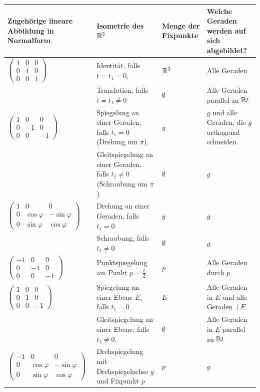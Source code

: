 \documentclass[
 a4paper,
 12pt,
 parskip=half
 ]{scrartcl}
\theoremstyle{plain}
\theoremstyle{definition}
\begin{document}
 {\center \small
 \begin{tabularx}{.95\textwidth}{|>{\center}m{3.6cm}|>{\center}m{3cm}|>{\center}m{3cm}|X|}
  \hline
  Zugehörige lineare Abbildung in Normalform 
   & Isometrie des $\mathbb{R}^3$ 
   & Menge der Fixpunkte 
   & Welche Geraden werden auf sich abgebildet? \\
  \hline
  $\begin{pmatrix} 1 & 0 & 0 \\ 0 & 1 & 0 \\ 0 & 0 & 1 \end{pmatrix}$ 
   & Identität, falls $t = t_1 = 0$, 
   & $\mathbb{R}^3$ 
   & Alle Geraden \\
   & Translation, falls $t = t_1 \ne 0$
   & $\emptyset$
   & Alle Geraden parallel zu $\mathbb{R} t$ \\  
  \hline
  $\begin{pmatrix} 1 & 0 & 0 \\ 0 & -1 & 0 \\ 0 & 0 & -1 \end{pmatrix}$
   & Spiegelung an einer Geraden, falls $t_1 = 0$ (Drehung um $\pi$),
   & $g$
   & $g$ und alle Geraden, die $g$ orthogonal schneiden. \\
   & Gleitspiegelung an einer Geraden, falls $t_1 \ne 0$ (Schraubung um $\pi$)
   & $\emptyset$
   & $g$ \\
  \hline
  $\begin{pmatrix} 1 & 0 & 0 \\ 0 & \cos \varphi & - \sin \varphi \\ 0 & \sin \varphi & \cos \varphi \end{pmatrix}$ 
   & Drehung an einer Geraden, falls $t_1 = 0$ 
   & $g$
   & $g$ \\
   & Schraubung, falls $t_1 \ne 0$
   & $\emptyset$
   & $g$ \\
  \hline
  $\begin{pmatrix} -1 & 0 & 0 \\ 0 & -1 & 0 \\ 0 & 0 & -1 \end{pmatrix}$
   & Punktspiegelung am Punkt $p=\frac{t}{2}$
   & $p$
   & Alle Geraden durch $p$ \\
  \hline
  $\begin{pmatrix} 1 & 0 & 0 \\ 0 & 1 & 0 \\ 0 & 0 & -1 \end{pmatrix}$
   & Spiegelung an einer Ebene $E$, falls $t_1 = 0$
   & $E$
   & Alle Geraden in $E$ und alle Geraden $\bot E$ \\
   & Gleitspiegelung an einer Ebene, falls $t_1 \ne 0$.
   & $\emptyset$
   & Alle Geraden in $E$ parallel zu $\mathbb{R} t$ \\
  \hline
  {\footnotesize $\begin{pmatrix} -1 & 0 & 0 \\ 0 & \cos \varphi & - \sin \varphi \\ 0 & \sin \varphi & \cos \varphi \end{pmatrix}$}
   & Drehspiegelung mit Drehspiegelachse $g$ und Fixpunkt $p$
   & $p$
   & $g$ \\
  \hline
 \end{tabularx} }
\end{document}
